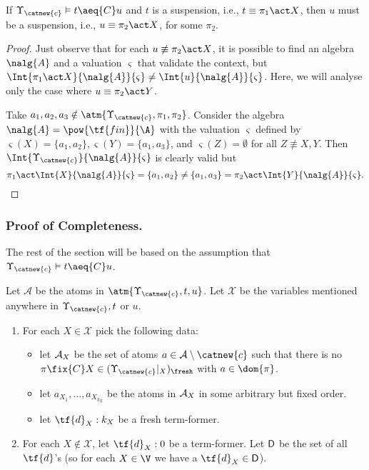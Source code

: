 \begin{lemma}\label{alemma:var-judge-valid}
    If $\Upsilon_{\catnew{c}} \vDash t \aeq{C} u$ and $t$ is a suspension, i.e., $t\equiv \pi_1\act X$, then $u$ must be a suspension, i.e.,  $u\equiv \pi_2\act X$, for some $\pi_2$.
\end{lemma}

\begin{proof}
        Just observe that for each $u \not\equiv \pi_2\act X$, it is possible to find an algebra $\nalg{A}$ and a valuation $\varsigma$ that validate the context, but $\Int{\pi_1\act X}{\nalg{A}}{\varsigma} \neq \Int{u}{\nalg{A}}{\varsigma}$. Here, we will analyse only the case where $u \equiv \pi_2\act Y$.

        Take $a_1,a_2,a_3\notin \atm{\Upsilon_{\catnew{c}},\pi_1,\pi_2}$. Consider the algebra $\nalg{A} = \pow{\tf{fin}}{\A}$ with the valuation $\varsigma$ defined by $\varsigma(X) = \{a_1,a_2\}, \varsigma(Y) = \{a_1,a_3\}$, and $\varsigma(Z) = \emptyset$ for all $Z\not\equiv  X,Y$. Then $\Int{\Upsilon_{\catnew{c}}}{\nalg{A}}{\varsigma}$ is clearly valid but
        \[
           \pi_1\act \Int{X}{\nalg{A}}{\varsigma} = \{a_1,a_2\} \neq \{a_1,a_3\} =  \pi_2\act \Int{Y}{\nalg{A}}{\varsigma}.
       \]
\end{proof}

\subsubsection{Proof of Completeness.}

The rest of the section will be based on the assumption that $\Upsilon_{\catnew{c}}\vDash t \aeq{C} u$.

\begin{definition}
    Let $\mathcal{A}$ be the atoms in $\atm{\Upsilon_{\catnew{c}},t,u}$. Let $\mathcal{X}$ be the variables mentioned anywhere in $\Upsilon_{\catnew{c}}, t$ or $u$.
    \begin{enumerate}
        \item For each $X\in\mathcal{X}$ pick the following data:
    \begin{itemize}
        \item let ${\cal A}_X$ be the set of atoms $a\in{\cal A}\setminus\catnew{c}$ such that there is no $\pi\fix{C} X\in(\Upsilon_{\catnew{c}}|_X)_{\fresh}$ with $a\in \dom{\pi}$.
        \item let $a_{X_1},\ldots,a_{X_{k_X}}$ be the atoms in ${\cal A}_X$ in some arbitrary but fixed order.
        \item let $\tf{d}_X:k_X$ be a fresh term-former.
    \end{itemize}

    \item For each $X \notin \mathcal{X}$, let $\tf{d}_X : 0$ be a term-former. Let $\sf{D}$ be the set of all $\tf{d}$'s (so for each $X\in\V$ we have a $\tf{d}_X\in \sf{D}$).
    \end{enumerate}
\end{definition}

